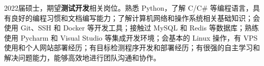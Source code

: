 {\onehalfspacing\hspace{2em}%
    2022届硕士，期望\textbf{测试开发}相关岗位。熟悉 Python，了解 C/C\# 等编程语言，具有良好的编程习惯和文档编写能力；了解计算机网络和操作系统相关基础知识；会使用 Git、SSH 和 Docker 等开发工具；接触过 MySQL 和 Redis 等数据库；熟练使用 Pycharm 和 Visual Studio 等集成开发环境；会基本的 Linux 操作，有 VPS 使用和个人网站部署经历；有目标检测程序开发和部署经历；有很强的自主学习和解决问题能力，能够高效地进行团队沟通和协作。
    \par}